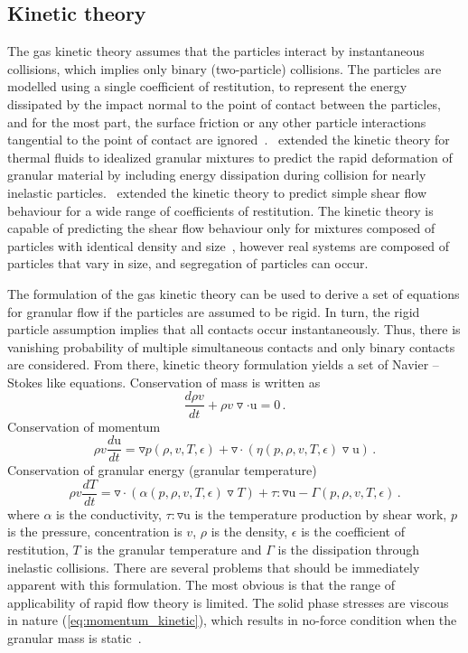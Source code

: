 \subsection{Kinetic theory}
The gas kinetic theory assumes that the particles interact by instantaneous 
collisions, which implies only binary (two-particle) collisions. The particles 
are modelled using a single coefficient of restitution, to represent the energy 
dissipated by the impact normal to the point of contact between the particles, 
and for the most part, the surface friction or any other particle interactions 
tangential to the point of contact are 
ignored~\citep{Campbell1990}.~\citet{Jenkins1983} extended the kinetic theory 
for thermal fluids to idealized granular mixtures to predict the rapid 
deformation of granular material by including energy dissipation during 
collision for nearly inelastic particles.~\citet{Savage1981} extended the 
kinetic theory to predict simple shear flow behaviour for a wide range of 
coefficients of restitution. The kinetic theory is capable of predicting the 
shear flow behaviour only for mixtures composed of particles with identical 
density and size~\citep{Iddir2005}, however real systems are composed of 
particles that vary in size, and segregation of particles can occur. 

The formulation of the gas kinetic theory can be used to derive a
set of equations for granular flow if the particles are assumed to
be rigid. In turn, the rigid particle assumption implies that all contacts 
occur instantaneously. Thus, there is vanishing probability of multiple 
simultaneous contacts and only binary contacts are considered. From there, 
kinetic theory formulation yields a set of Navier – Stokes like equations. 
Conservation of mass is written as
\begin{equation}
\frac{d \rho v}{dt} + \rho v \triangledown \cdot \mathrm{u} = 0 \,.
\end{equation}
\noindent Conservation of momentum
\begin{equation}
\label{eq:momentum_kinetic}
\rho v \frac{d \mathrm{u}}{dt} = \triangledown p(\rho,v,T,\epsilon) + 
\triangledown \cdot ( \eta (p,\rho,v,T,\epsilon)  \triangledown \mathrm{u}) \,.
\end{equation}
\noindent Conservation of granular energy (granular temperature)
\begin{equation}
\rho v \frac{d T}{dt} = \triangledown \cdot ( \alpha (p,\rho,v,T,\epsilon)  
\triangledown T) + \tau : \triangledown \mathrm{u} - \Gamma 
(p,\rho,v,T,\epsilon)  \,.
\end{equation}
where $\alpha$ is the conductivity, $\tau : \triangledown \mathrm{u}$ is the 
temperature production by shear work, $p$ is the pressure, concentration is 
$v$, $\rho$ is the density, $\epsilon$ is the coefficient of restitution, $T$ 
is the granular temperature and $\Gamma$ is the dissipation through inelastic 
collisions. There are several problems that should be immediately
apparent with this formulation. The most obvious is that the
range of applicability of rapid flow theory is limited. The solid phase 
stresses are viscous in nature (\cref{eq:momentum_kinetic}), which results in 
no-force condition when the granular mass is static~\citep{Campbell2006}.

